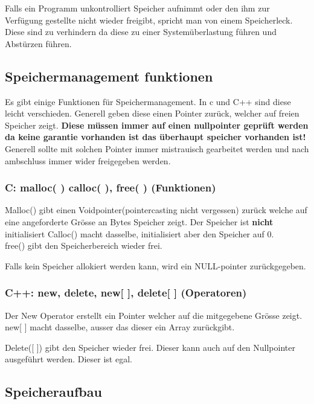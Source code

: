 Falls ein Programm unkontrolliert Speicher aufnimmt oder den ihm zur Verfügung gestellte nicht wieder freigibt, spricht man von einem Speicherleck. 
Diese sind zu verhindern da diese zu einer Systemüberlastung führen und Abstürzen führen.

\subsection{Speichermanagement funktionen}

Es gibt einige Funktionen für Speichermanagement. In c und C++ sind diese leicht verschieden. 
Generell geben diese einen Pointer zurück, welcher auf freien Speicher zeigt. 
\textbf{Diese müssen immer auf einen nullpointer geprüft werden da keine garantie vorhanden ist das überhaupt speicher vorhanden ist!}
Generell sollte mit solchen Pointer immer mistrauisch gearbeitet werden und nach ambschluss immer wider freigegeben werden.

\subsubsection{C: malloc( ) calloc( ), free( ) (Funktionen)}

Malloc() gibt einen Voidpointer(pointercasting nicht vergessen) zurück welche auf eine angeforderte Grösse an Bytes Speicher zeigt. 
Der Speicher ist \textbf{nicht} initialisiert
Calloc() macht dasselbe, initialisiert aber den Speicher auf 0.\\
free() gibt den Speicherbereich wieder frei.



Falls kein Speicher allokiert werden kann, wird ein NULL-pointer zurückgegeben.

\subsubsection{C++: new, delete, new[ ], delete[ ] (Operatoren)}

Der New Operator erstellt ein Pointer welcher auf die mitgegebene Grösse zeigt.
new[ ] macht dasselbe, ausser das dieser ein Array zurückgibt.

Delete([ ]) gibt den Speicher wieder frei. 
Dieser kann auch auf den Nullpointer ausgeführt werden. 
Dieser ist  egal.



\subsection{Speicheraufbau}

